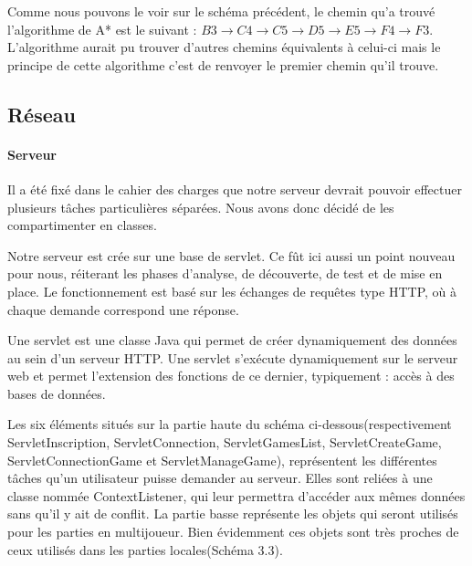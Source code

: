 			Comme nous pouvons le voir sur le schéma précédent, le chemin qu'a trouvé l'algorithme de A* est le suivant : $ B3 \rightarrow C4 \rightarrow C5 \rightarrow D5 \rightarrow E5 \rightarrow F4 \rightarrow F3 $. L'algorithme aurait pu trouver d'autres chemins équivalents à celui-ci mais le principe de cette algorithme c'est de renvoyer le premier chemin qu'il trouve.


\subsection{Réseau}
		
	\paragraph{Serveur\\}
			
		Il a été fixé dans le cahier des charges que notre serveur devrait pouvoir
		effectuer plusieurs tâches particulières séparées. Nous avons donc décidé de
		les compartimenter en classes.
		
		Notre serveur est crée sur une base de servlet. Ce fût ici
		aussi un point nouveau pour nous, réiterant les phases d'analyse, de
		découverte, de test et de mise en place. Le fonctionnement est basé sur les
		échanges de requêtes type HTTP, où à chaque demande correspond une réponse. 
		
		Une servlet est une classe Java qui permet de créer dynamiquement des données
		au sein d'un serveur HTTP. Une servlet s'exécute dynamiquement sur le serveur
		web et permet l'extension des fonctions de ce dernier, typiquement : accès à
		des bases de données.
			
		Les six éléments situés sur la partie haute du schéma
		ci-dessous(respectivement ServletInscription, ServletConnection,
		ServletGamesList, ServletCreateGame, ServletConnectionGame et
		ServletManageGame), représentent les différentes tâches qu'un utilisateur
		puisse demander au serveur. Elles sont reliées à une classe nommée
		ContextListener, qui leur permettra d'accéder aux mêmes données sans qu'il y
		ait de conflit. La partie basse représente les objets qui seront utilisés 
		pour les parties en multijoueur. 
		Bien évidemment ces objets sont très proches de ceux utilisés dans les parties
		locales(Schéma 3.3).
		
